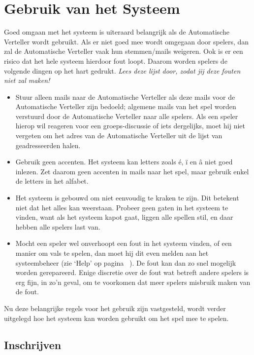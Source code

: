 \documentclass[12pt]{article}
\begin{document}
\section{Gebruik van het Systeem}

  Goed omgaan met het systeem is uiteraard belangrijk als de Automatische Verteller wordt gebruikt. Als er niet goed mee wordt omgegaan door spelers, dan zal de Automatische Verteller vaak hun stemmen/mails weigeren. Ook is er een risico dat het hele systeem hierdoor fout loopt. Daarom worden spelers de volgende dingen op het hart gedrukt. \emph{Lees deze lijst door, zodat jij deze fouten niet zal maken!}
  
  \begin{itemize}
    \item Stuur alleen mails naar de Automatische Verteller als deze mails voor de Automatische Verteller zijn bedoeld; algemene mails van het spel worden verstuurd door de Automatische Verteller naar alle spelers. Als een speler hierop wil reageren voor een groeps-discussie of iets dergelijks, moet hij niet vergeten om het adres van de Automatische Verteller uit de lijst van geadresseerden halen.
    \item Gebruik geen accenten. Het systeem kan letters zoals \'e, \"i en \^a niet goed inlezen. Zet daarom geen accenten in mails naar het spel, maar gebruik enkel de letters in het alfabet.
    \item Het systeem is gebouwd om niet eenvoudig te kraken te zijn. Dit betekent niet dat het alles kan weerstaan. Probeer geen gaten in het systeem te vinden, want als het systeem kapot gaat, liggen alle spellen stil, en daar hebben alle spelers last van.
    \item Mocht een speler wel onverhoopt een fout in het systeem vinden, of een manier om vals te spelen, dan moet hij dit even melden aan het systeembeheer (zie `Help' op pagina~\pageref{subsec:help} ). De fout kan dan zo snel mogelijk worden gerepareerd. Enige discretie over de fout wat betreft andere spelers is erg fijn, in zo'n geval, om te voorkomen dat meer spelers misbruik maken van de fout.
  \end{itemize}
  
  Nu deze belangrijke regels voor het gebruik zijn vastgesteld, wordt verder uitgelegd hoe het systeem kan worden gebruikt om het spel mee te spelen.

  \subsection{Inschrijven}
  
\end{document}
